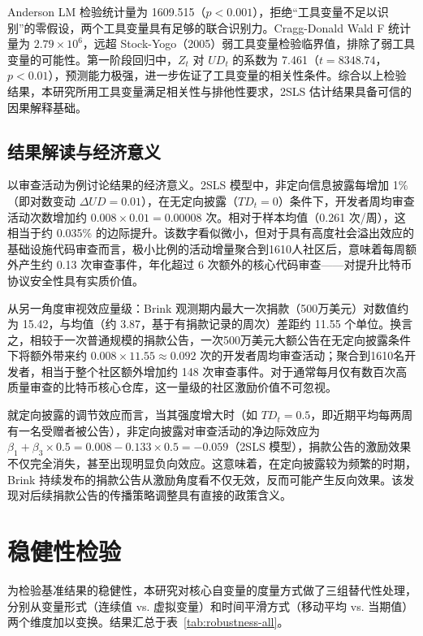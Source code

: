 \documentclass[
    type = master, %
    degree = professional,        %
    decl-page,  %
    twoside,                %
    fontset = fandol %
  ]{njuthesis}
\begin{document}
Anderson LM 检验统计量为 1609.515（$p < 0.001$），拒绝“工具变量不足以识别”的零假设，两个工具变量具有足够的联合识别力。Cragg-Donald Wald F 统计量为 $2.79 \times 10^6$，远超 Stock-Yogo（2005）\cite{stock2005testing}弱工具变量检验临界值，排除了弱工具变量的可能性。第一阶段回归中，$Z_t$ 对 $UD_t$ 的系数为 7.461（$t = 8348.74$，$p < 0.01$），预测能力极强，进一步佐证了工具变量的相关性条件。综合以上检验结果，本研究所用工具变量满足相关性与排他性要求，2SLS 估计结果具备可信的因果解释基础。

\subsection{结果解读与经济意义}

以审查活动为例讨论结果的经济意义。2SLS 模型中，非定向信息披露每增加 1\%（即对数变动 $\Delta UD = 0.01$），在无定向披露（$TD_t = 0$）条件下，开发者周均审查活动次数增加约 $0.008 \times 0.01 = 0.00008$ 次。相对于样本均值（0.261 次/周），这相当于约 0.035\% 的边际提升。该数字看似微小，但对于具有高度社会溢出效应的基础设施代码审查而言，极小比例的活动增量聚合到1610人社区后，意味着每周额外产生约 0.13 次审查事件，年化超过 6 次额外的核心代码审查——对提升比特币协议安全性具有实质价值。

从另一角度审视效应量级：Brink 观测期内最大一次捐款（500万美元）对数值约为 15.42，与均值（约 3.87，基于有捐款记录的周次）差距约 11.55 个单位。换言之，相较于一次普通规模的捐款公告，一次500万美元大额公告在无定向披露条件下将额外带来约 $0.008 \times 11.55 \approx 0.092$ 次的开发者周均审查活动；聚合到1610名开发者，相当于整个社区额外增加约 148 次审查事件。对于通常每月仅有数百次高质量审查的比特币核心仓库，这一量级的社区激励价值不可忽视。

就定向披露的调节效应而言，当其强度增大时（如 $TD_t = 0.5$，即近期平均每两周有一名受赠者被公告），非定向披露对审查活动的净边际效应为 $\beta_1 + \beta_3 \times 0.5 = 0.008 - 0.133 \times 0.5 = -0.059$（2SLS 模型），捐款公告的激励效果不仅完全消失，甚至出现明显负向效应。这意味着，在定向披露较为频繁的时期，Brink 持续发布的捐款公告从激励角度看不仅无效，反而可能产生反向效果。该发现对后续捐款公告的传播策略调整具有直接的政策含义。

\section{稳健性检验}
\label{sec:robust-1}

为检验基准结果的稳健性，本研究对核心自变量的度量方式做了三组替代性处理，分别从变量形式（连续值 vs. 虚拟变量）和时间平滑方式（移动平均 vs. 当期值）两个维度加以变换。结果汇总于表~\ref{tab:robustness-all}。
\end{document}
